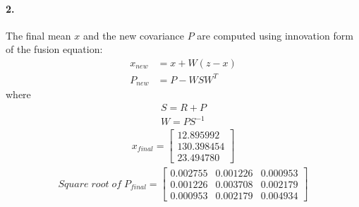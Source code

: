 \documentclass[a4paper]{article}
\begin{document}
\paragraph{2. } The final mean $x$ and the new covariance $P$ are computed using innovation form of the fusion equation:
\begin{align*}
x_{new} &= x + W(z-x) \\
P_{new} &= P - WSW^{T}
\end{align*}
where
\begin{align*}
S = R + P \\
W = PS^{-1}
\end{align*}
\begin{align*}
x_{final} = 
	\begin{bmatrix}
		12.895992   \\  130.398454   \\   23.494780
	\end{bmatrix}
\end{align*}
\begin{align*}
Square \; root \; of \; P_{final} = 
	\begin{bmatrix}
        0.002755   &    0.001226   &    0.000953 \\
      	0.001226   &    0.003708   &    0.002179 \\
      	0.000953   &    0.002179   &    0.004934
	\end{bmatrix}
\end{align*}
\end{document}
